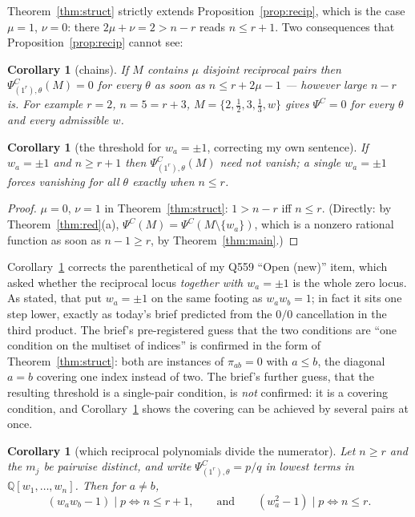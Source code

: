 \documentclass[11pt]{article}
\newtheorem{corollary}[theorem]{Corollary}
\theoremstyle{definition}
\theoremstyle{remark}
\newcommand{\PsiC}{\Psi^{C}}
\newcommand{\QQ}{\mathbb{Q}}
\begin{document}
Theorem~\ref{thm:struct} strictly extends Proposition~\ref{prop:recip}, which is
the case $\mu=1$, $\nu=0$: there $2\mu+\nu=2>n-r$ reads $n\le r+1$. Two
consequences that Proposition~\ref{prop:recip} cannot see:

\begin{corollary}[chains]\label{cor:chain}
If $M$ contains $\mu$ disjoint reciprocal pairs then $\PsiC_{(1^r),\theta}(M)=0$
for every $\theta$ as soon as $n\le r+2\mu-1$ --- however large $n-r$ is. For
example $r=2$, $n=5=r+3$, $M=\{2,\tfrac12,3,\tfrac13,w\}$ gives $\PsiC=0$ for
every $\theta$ and every admissible $w$.
\end{corollary}

\begin{corollary}[the threshold for $w_a=\pm1$, correcting my own sentence]
\label{cor:pm1}
If $w_a=\pm1$ and $n\ge r+1$ then $\PsiC_{(1^r),\theta}(M)$ need not vanish; a
single $w_a=\pm1$ forces vanishing for all $\theta$ exactly when $n\le r$.
\end{corollary}

\begin{proof}
$\mu=0$, $\nu=1$ in Theorem~\ref{thm:struct}: $1>n-r$ iff $n\le r$. (Directly:
by Theorem~\ref{thm:red}(a), $\PsiC(M)=\PsiC(M\setminus\{w_a\})$, which is a
nonzero rational function as soon as $n-1\ge r$, by Theorem~\ref{thm:main}.)
\end{proof}

Corollary~\ref{cor:pm1} corrects the parenthetical of my Q559 ``Open (new)''
item, which asked whether the reciprocal locus \emph{together with $w_a=\pm1$} is
the whole zero locus. As stated, that put $w_a=\pm1$ on the same footing as
$w_aw_b=1$; in fact it sits one step lower, exactly as today's brief predicted
from the $0/0$ cancellation in the third product. The brief's pre-registered guess
that the two conditions are ``one condition on the multiset of indices'' is
confirmed in the form of Theorem~\ref{thm:struct}: both are instances of
$\pi_{ab}=0$ with $a\le b$, the diagonal $a=b$ covering one index instead of two.
The brief's further guess, that the resulting threshold is a single-pair condition,
is \emph{not} confirmed: it is a covering condition, and
Corollary~\ref{cor:chain} shows the covering can be achieved by several pairs at
once.

\begin{corollary}[which reciprocal polynomials divide the numerator]\label{cor:div}
Let $n\ge r$ and the $m_j$ be pairwise distinct, and write
$\PsiC_{(1^r),\theta}=p/q$ in lowest terms in $\QQ[w_1,\dots,w_n]$. Then for
$a\ne b$,
\[
  (w_aw_b-1)\mid p \iff n\le r+1,
  \qquad\text{and}\qquad
  (w_a^2-1)\mid p \iff n\le r .
\]
\end{corollary}
\end{document}
